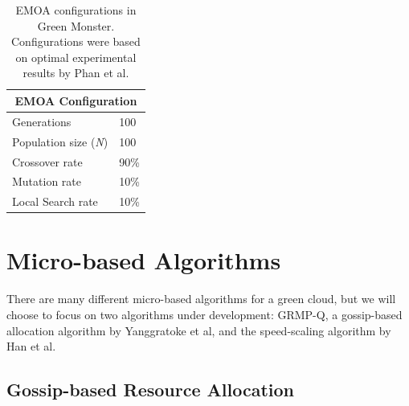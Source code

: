 \documentclass{sig-alternate}
\begin{document}
\begin{table}[tb]
\begin{center}
\begin{tabular}{|l|l|}
    \hline
    \multicolumn{2}{|c|}{\textbf{EMOA Configuration}} \\
    \hline
    Generations & 100 \\
    Population size (\emph{N}) & 100 \\
    Crossover rate & 90\% \\
    Mutation rate & 10\% \\
    Local Search rate & 10\% \\
    \hline
\end{tabular}
\caption{EMOA configurations in Green Monster. Configurations were based on optimal experimental results by Phan et al.}
\label{tab:EMOAConfig}
\end{center}
\end{table}



\section{Micro-based Algorithms} 
\label{sec:MicAl}

There are many different micro-based algorithms for a green cloud, but we will choose to focus on two algorithms under development: GRMP-Q, a gossip-based allocation algorithm by Yanggratoke et al, and the speed-scaling algorithm by Han et al. 
\subsection{Gossip-based Resource Allocation}
\label{sec:GBRA}

\end{document}
